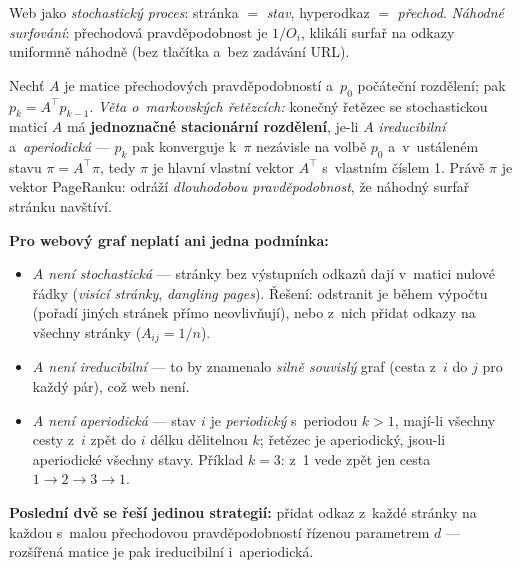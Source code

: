 \documentclass[11pt,a4paper]{article}
\theoremstyle{definition}
\begin{document}
\begin{defbox}
Web jako \emph{stochastický proces}: stránka $=$ \emph{stav}, hyperodkaz $=$ \emph{přechod}.
\emph{Náhodné surfování}: přechodová pravděpodobnost je $1/O_i$, klikáli surfař na odkazy
uniformně náhodně (bez tlačítka  a~bez zadávání URL).

Nechť $A$ je matice přechodových pravděpodobností a~$p_0$ počáteční rozdělení; pak
$p_k=A^{\!\top}p_{k-1}$. \emph{Věta o~markovských řetězcích:} konečný řetězec se stochastickou
maticí $A$ má \textbf{jednoznačné stacionární rozdělení}, je-li $A$ \emph{ireducibilní}
a~\emph{aperiodická} --- $p_k$ pak konverguje k~$\pi$ nezávisle na volbě $p_0$ a~v~ustáleném
stavu $\pi=A^{\!\top}\pi$, tedy $\pi$ je hlavní vlastní vektor $A^{\!\top}$ s~vlastním číslem 1.
Právě $\pi$ je vektor PageRanku: odráží \emph{dlouhodobou pravděpodobnost}, že náhodný surfař
stránku navštíví.

\textbf{Pro webový graf neplatí ani jedna podmínka:}
\begin{itemize}
\item \emph{$A$ není stochastická} --- stránky bez výstupních odkazů dají v~matici nulové řádky
      (\emph{visící stránky}, \emph{dangling pages}). Řešení: odstranit je během výpočtu (pořadí
      jiných stránek přímo neovlivňují), nebo z~nich přidat odkazy na všechny stránky
      ($A_{ij}=1/n$).
\item \emph{$A$ není ireducibilní} --- to by znamenalo \emph{silně souvislý} graf (cesta z~$i$
      do $j$ pro každý pár), což web není.
\item \emph{$A$ není aperiodická} --- stav $i$ je \emph{periodický} s~periodou $k>1$, mají-li
      všechny cesty z~$i$ zpět do $i$ délku dělitelnou $k$; řetězec je aperiodický, jsou-li
      aperiodické všechny stavy. Příklad $k=3$: z~1 vede zpět jen cesta $1\to2\to3\to1$.
\end{itemize}
\textbf{Poslední dvě se řeší jedinou strategií:} přidat odkaz z~každé stránky na každou s~malou
přechodovou pravděpodobností řízenou parametrem $d$ --- rozšířená matice je pak ireducibilní
i~aperiodická.
\end{defbox}
\end{document}
